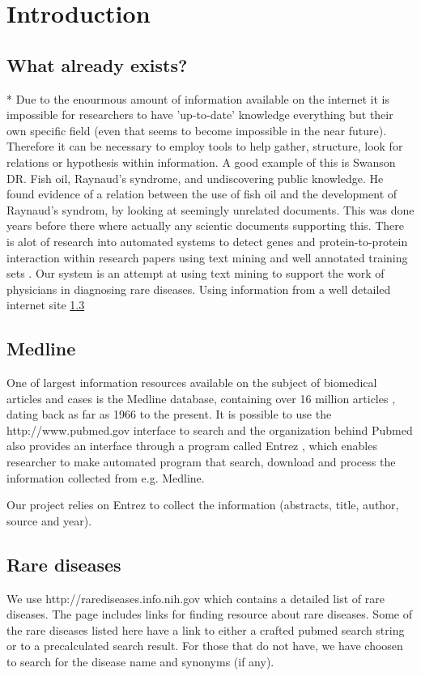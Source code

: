 \section{Introduction}


\subsection{What already exists?}
* Due to the enourmous amount of information available on the internet it is impossible for researchers to have 'up-to-date' knowledge everything but their own specific field (even that seems to become impossible in the near future). Therefore it can be necessary to employ tools to help gather, structure, look for relations or hypothesis within information. A good example of this is Swanson DR. Fish oil, Raynaud's syndrome, and undiscovering public knowledge. He found evidence of a relation between the use of fish oil and the development of Raynaud's syndrom, by looking at seemingly unrelated documents. This was done years before there where actually any scientic documents supporting this.
There is alot of research into automated systems to detect genes and protein-to-protein interaction within research papers using text mining and well annotated training sets .
Our system is an attempt at using text mining to support the work of physicians in diagnosing rare diseases. Using information from a well detailed internet site \ref{sec:rarediseases} %

\subsection{Medline}
One of largest information resources available on the subject of biomedical articles and cases is the Medline database, containing over 16 million articles , dating back as far as 1966 to the present. It is possible to use the http://www.pubmed.gov interface to search and the organization behind Pubmed also provides an interface through a program called Entrez , which enables researcher to make automated program that search, download and process the information collected from e.g. Medline.

Our project relies on Entrez to collect the information (abstracts, title, author, source and year). 

\subsection{Rare diseases}
\label{sec:rarediseases}
We use http://rarediseases.info.nih.gov  which contains a detailed list of rare diseases. The page includes links for finding resource about rare diseases. Some of the rare diseases listed here have a link to either a crafted pubmed search string or to a precalculated search result. For those that do not have, we have choosen to search for the disease name and synonyms (if any).
